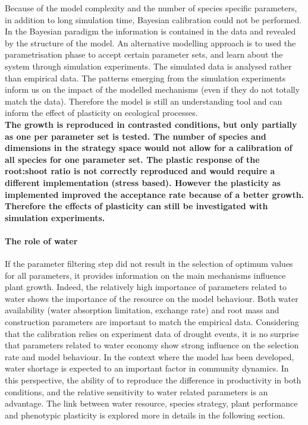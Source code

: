 Because of the model complexity and the number of species specific parameters, in addition to long simulation time, Bayesian calibration could not be performed. In the Bayesian paradigm the information is contained in the data and revealed by the structure of the model. An alternative modelling approach is to used the parametrisation phase to accept certain parameter sets, and learn about the system through simulation experiments. The simulated data is analysed rather than empirical data. The patterns emerging from the simulation experiments inform us on the impact of the modelled mechanisms (even if they do not totally match the data). Therefore the model is still an understanding tool and can inform the effect of plasticity on ecological processes.\\


\textbf{The growth is reproduced in contrasted conditions, but only partially as one per parameter set is tested. The number of species and dimensions in the strategy space would not allow for a calibration of all species for one parameter set. The plastic response of the root:shoot ratio is not correctly reproduced and would require a different implementation (stress based). However the plasticity as implemented improved the acceptance rate because of a better growth. Therefore the effects of plasticity can still be investigated with simulation experiments.}

\paragraph{The role of water}

If the parameter filtering step did not result in the selection of optimum values for all parameters, it provides information on the main mechanisms influence plant growth. 
Indeed, the relatively high importance of parameters related to water shows the importance of the resource on the model behaviour. Both water availability (water absorption limitation, exchange rate) and root mass and construction parameters are important to match the empirical data. Considering that the calibration relies on experiment data of drought events, it is no surprise that parameters related to water economy show strong influence on the selection rate and model behaviour. In the context where the model has been developed, water shortage is expected to an important factor in community dynamics. In this perspective, the ability of \model to reproduce the difference in productivity in both conditions, and the relative sensitivity to water related parameters is an advantage. The link between water resource, species strategy, plant performance and phenotypic plasticity is explored more in details in the following section.


